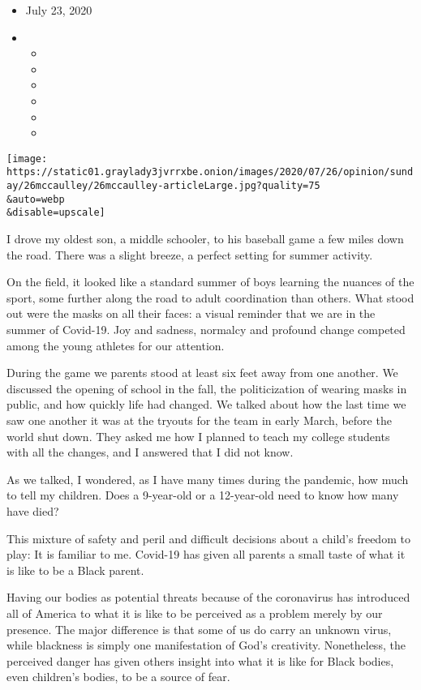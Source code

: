 \begin{itemize}
\item
  July 23, 2020
\item
  \begin{itemize}
  \item
  \item
  \item
  \item
  \item
  \item
  \end{itemize}
\end{itemize}

\texttt{[image: https://static01.graylady3jvrrxbe.onion/images/2020/07/26/opinion/sunday/26mccaulley/26mccaulley-articleLarge.jpg?quality=75\\\&auto=webp\\\&disable=upscale]}

I drove my oldest son, a middle schooler, to his baseball game a few
miles down the road. There was a slight breeze, a perfect setting for
summer activity.

On the field, it looked like a standard summer of boys learning the
nuances of the sport, some further along the road to adult coordination
than others. What stood out were the masks on all their faces: a visual
reminder that we are in the summer of Covid-19. Joy and sadness,
normalcy and profound change competed among the young athletes for our
attention.

During the game we parents stood at least six feet away from one
another. We discussed the opening of school in the fall, the
politicization of wearing masks in public, and how quickly life had
changed. We talked about how the last time we saw one another it was at
the tryouts for the team in early March, before the world shut down.
They asked me how I planned to teach my college students with all the
changes, and I answered that I did not know.

As we talked, I wondered, as I have many times during the pandemic, how
much to tell my children. Does a 9-year-old or a 12-year-old need to
know how many have died?

This mixture of safety and peril and difficult decisions about a child's
freedom to play: It is familiar to me. Covid-19 has given all parents a
small taste of what it is like to be a Black parent.

Having our bodies as potential threats because of the coronavirus has
introduced all of America to what it is like to be perceived as a
problem merely by our presence. The major difference is that some of us
do carry an unknown virus, while blackness is simply one manifestation
of God's creativity. Nonetheless, the perceived danger has given others
insight into what it is like for Black bodies, even children's bodies,
to be a source of fear.

